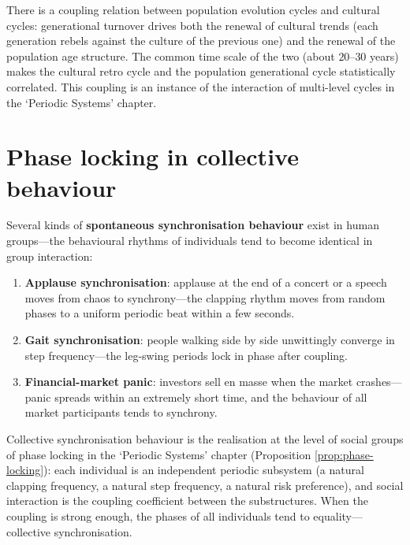 \begin{remark}
There is a coupling relation between population evolution cycles and cultural cycles: generational turnover drives both the renewal of cultural trends (each generation rebels against the culture of the previous one) and the renewal of the population age structure. The common time scale of the two (about $20$--$30$ years) makes the cultural retro cycle and the population generational cycle statistically correlated. This coupling is an instance of the interaction of multi-level cycles in the `Periodic Systems' chapter.
\end{remark}

\section{Phase locking in collective behaviour}

\begin{definition}\label{def:collective_synchrony}
Several kinds of \textbf{spontaneous synchronisation behaviour} exist in human groups---the behavioural rhythms of individuals tend to become identical in group interaction:
\begin{enumerate}[label=(\roman*)]
    \item \textbf{Applause synchronisation}: applause at the end of a concert or a speech moves from chaos to synchrony---the clapping rhythm moves from random phases to a uniform periodic beat within a few seconds.
    \item \textbf{Gait synchronisation}: people walking side by side unwittingly converge in step frequency---the leg-swing periods lock in phase after coupling.
    \item \textbf{Financial-market panic}: investors sell en masse when the market crashes---panic spreads within an extremely short time, and the behaviour of all market participants tends to synchrony.
\end{enumerate}
Collective synchronisation behaviour is the realisation at the level of social groups of phase locking in the `Periodic Systems' chapter (Proposition \ref{prop:phase-locking}): each individual is an independent periodic subsystem (a natural clapping frequency, a natural step frequency, a natural risk preference), and social interaction is the coupling coefficient between the substructures. When the coupling is strong enough, the phases of all individuals tend to equality---collective synchronisation.
\end{definition}

